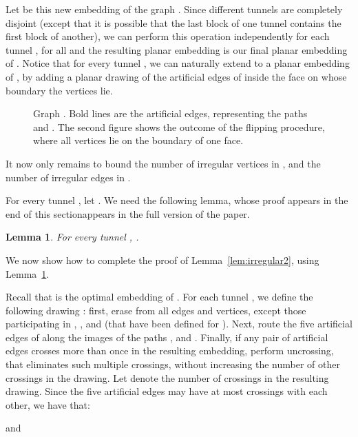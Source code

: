 \documentclass[twoside,leqno,twocolumn]{article}
\newtheorem{lemma}{Lemma}
\begin{document}
Let  be this new embedding of the graph . 
Since different tunnels are completely disjoint (except that it is possible that the last block of one tunnel contains the first block of another), we can perform this operation independently for each tunnel , for all  and the resulting planar 
embedding  is our final planar embedding of . 
Notice that for every tunnel , we can naturally extend  to a planar embedding  of , by adding a planar drawing of the  artificial edges of  inside the face on whose boundary the vertices  lie.



\begin{figure}
\begin{center}
\ifabstract
{}
\fi\iffull
{}
\fi
\caption{Graph . Bold lines are the artificial edges, representing the paths  and . The second figure shows the outcome of the flipping procedure, where all vertices  lie on the boundary of one face.\label{fig:tunnel}}
\end{center}
\end{figure}

It now only remains to bound the number of irregular vertices in , and the number of irregular edges in .


For every tunnel , let .
We need the following lemma, whose proof \iffull appears in the end of this section\fi \ifabstract appears in the full version of the paper\fi.

\begin{lemma} \label{lem:JZ-connected}
For every tunnel , .
\end{lemma}

We now show how to complete the proof of
Lemma~\ref{lem:irregular2}, using Lemma~\ref{lem:JZ-connected}.

Recall that  is the optimal embedding of . For each tunnel , we define the following drawing : first, erase from  all edges and vertices, except those participating in , ,  and  (that have been defined for ). Next, route the five artificial edges of  along the images of the paths ,  and . Finally, if any pair of artificial edges crosses more than once in the resulting embedding, perform uncrossing, that eliminates such multiple crossings, without increasing the number of other crossings in the drawing. Let  denote the number of crossings in the resulting drawing. Since the five artificial edges may have at most  crossings with each other, we have that:

and
\end{document}
